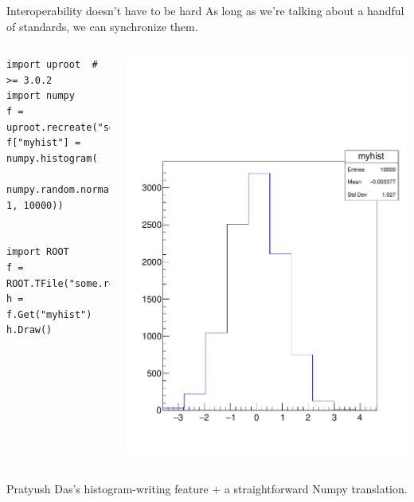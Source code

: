 \documentclass[aspectratio=169]{beamer}
\begin{document}
\begin{frame}[fragile]{Interoperability doesn't have to be hard}
\large
\vspace{0.25 cm}
As long as we're talking about a handful of standards, we can synchronize them.

\begin{columns}
\small
\vspace{-0.5 cm}
\begin{verbatim}
import uproot  # >= 3.0.2
import numpy
f = uproot.recreate("some.root")
f["myhist"] = numpy.histogram(
    numpy.random.normal(0, 1, 10000))


import ROOT
f = ROOT.TFile("some.root")
h = f.Get("myhist")
h.Draw()
\end{verbatim}
\hfill \includegraphics[width=\linewidth]{numpy-to-root.pdf}
\end{columns}

\large
Pratyush Das's histogram-writing feature $+$ a straightforward Numpy translation.
\end{frame}
\end{document}
